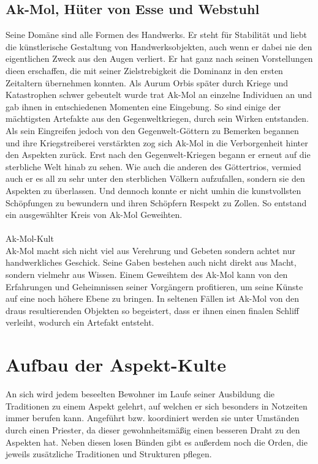 \documentclass[a4paper,12pt,oneside]{book}
\begin{document}
\subsection{Ak-Mol, Hüter von Esse und Webstuhl}\label{Ak-Mol}
Seine Domäne sind alle Formen des Handwerks. Er steht für Stabilität und liebt die künstlerische Gestaltung von Handwerksobjekten, auch wenn er dabei nie den eigentlichen Zweck aus den Augen verliert. Er hat ganz nach seinen Vorstellungen dieen erschaffen, die mit seiner Zielstrebigkeit die Dominanz in den ersten Zeitaltern übernehmen konnten. Als Aurum Orbis später durch Kriege und Katastrophen schwer gebeutelt wurde trat Ak-Mol an einzelne Individuen an und gab ihnen in entschiedenen Momenten eine Eingebung. So sind einige der mächtigsten Artefakte aus den Gegenweltkriegen, durch sein Wirken entstanden. Als sein Eingreifen jedoch von den Gegenwelt-Göttern zu Bemerken begannen und ihre Kriegstreiberei verstärkten zog sich Ak-Mol in die Verborgenheit hinter den Aspekten zurück. Erst nach den Gegenwelt-Kriegen begann er erneut auf die sterbliche Welt hinab zu sehen. Wie auch die anderen des Göttertrios, vermied auch er es all zu sehr unter den sterblichen Völkern aufzufallen, sondern sie den Aspekten zu überlassen.  Und dennoch konnte er nicht umhin die kunstvollsten Schöpfungen zu bewundern und ihren Schöpfern Respekt zu Zollen. So entstand ein ausgewählter Kreis von Ak-Mol Geweihten.
\\\\\large Ak-Mol-Kult
\\\normalsize Ak-Mol macht sich nicht viel aus Verehrung und Gebeten sondern achtet nur handwerkliches Geschick. Seine Gaben bestehen auch nicht direkt aus Macht, sondern vielmehr aus Wissen. Einem Geweihtem des Ak-Mol kann von den Erfahrungen und Geheimnissen seiner Vorgängern profitieren, um seine Künste auf eine noch höhere Ebene zu bringen. In seltenen Fällen ist Ak-Mol von den draus resultierenden Objekten so begeistert, dass er ihnen einen finalen Schliff verleiht, wodurch ein Artefakt entsteht.

\section{Aufbau der Aspekt-Kulte}
An sich wird jedem beseelten Bewohner im Laufe seiner Ausbildung die Traditionen zu einem Aspekt gelehrt, auf welchen er sich besonders in Notzeiten immer berufen kann. Angeführt bzw. koordiniert werden sie unter Umständen durch einen Priester, da dieser gewohnheitsmäßig einen besseren Draht zu den Aspekten hat. Neben diesen losen Bünden gibt es außerdem noch die Orden, die jeweils zusätzliche Traditionen und Strukturen pflegen.
\end{document}
